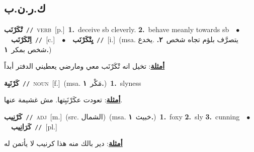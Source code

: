 \documentclass[10pt,a4paper,twoside]{article} %
\begin{document}
\begin{multicols}{2}
\vspace{-3mm}
\subsection*{\color{blue}\foreignlanguage{arabic}{ك.ر.ن.ب}\color{blue}{}} 

{\setlength\topsep{0pt}\textbf{\foreignlanguage{arabic}{تْكَرْنَب}}\ {\color{gray}\texttt{//}\color{black}}\ \textsc{verb}\ [p.]\ \textbf{1.}~deceive sb cleverly.  \textbf{2.}~behave meanly towards sb\ \ $\bullet$\ \ \setlength\topsep{0pt}\textbf{\foreignlanguage{arabic}{اِتْكَرْنَب}}\ {\color{gray}\texttt{//}\color{black}}\ [c.]\ \ $\bullet$\ \ \setlength\topsep{0pt}\textbf{\foreignlanguage{arabic}{يِتْكَرْنَب}}\ {\color{gray}\texttt{//}\color{black}}\ [i.]\ \color{gray}(msa. \foreignlanguage{arabic}{يتصرَّف بلؤم تجاه شخص}~\foreignlanguage{arabic}{\textbf{٢.}}  .\foreignlanguage{arabic}{يخدع شخص بمكر}~\foreignlanguage{arabic}{\textbf{١.}})\color{black}\  \begin{flushright}\color{gray}\foreignlanguage{arabic}{\textbf{\underline{\foreignlanguage{arabic}{أمثلة}}}: تخيل انه تْكَرْنَب معي ومارضي يعطيني الدفتر أبداً}\end{flushright}\color{black}} \vspace{2mm}

{\setlength\topsep{0pt}\textbf{\foreignlanguage{arabic}{كَرْنَبِة}}\ {\color{gray}\texttt{//}\color{black}}\ \textsc{noun}\ [f.]\ \color{gray}(msa. \foreignlanguage{arabic}{مَكْر}~\foreignlanguage{arabic}{\textbf{١.}})\color{black}\ \textbf{1.}~slyness\  \begin{flushright}\color{gray}\foreignlanguage{arabic}{\textbf{\underline{\foreignlanguage{arabic}{أمثلة}}}: تعودت عكَرْنَبِتها. مش غشيمة عنها.}\end{flushright}\color{black}} \vspace{2mm}

{\setlength\topsep{0pt}\textbf{\foreignlanguage{arabic}{كَرْنِيب}}\ {\color{gray}\texttt{//}\color{black}}\ \textsc{adj}\ [m.]\ (src. \color{gray}\foreignlanguage{arabic}{الشمال}\color{black})\ \color{gray}(msa. \foreignlanguage{arabic}{خبيث}~\foreignlanguage{arabic}{\textbf{١.}})\color{black}\ \textbf{1.}~foxy  \textbf{2.}~sly  \textbf{3.}~cunning\ \ $\bullet$\ \ \setlength\topsep{0pt}\textbf{\foreignlanguage{arabic}{كَرَانِيب}}\ {\color{gray}\texttt{//}\color{black}}\ [pl.]\  \begin{flushright}\color{gray}\foreignlanguage{arabic}{\textbf{\underline{\foreignlanguage{arabic}{أمثلة}}}: دير بالك منه هذا كرنيب لا يأتمن له}\end{flushright}\color{black}} \vspace{2mm}


\end{multicols}
\end{document}
